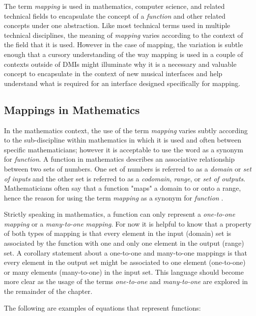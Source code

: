 The term \emph{mapping} is used in mathematics, computer science, and related technical fields to encapsulate the concept of a \emph{function} and other related concepts under one abstraction. Like most technical terms used in multiple technical disciplines, the meaning of \emph{mapping} varies according to the context of the field that it is used. However in the case of mapping, the variation is subtle enough that a cursory understanding of the way mapping is used in a couple of contexts outside of DMIs might illuminate why it is a necessary and valuable concept to encapsulate in the context of new musical interfaces and help understand what is required for an interface designed specifically for mapping.

\subsection{Mappings in Mathematics}
\label{sec:Mappings in Mathematics}

In the mathematics context, the use of the term \emph{mapping} varies subtly according to the sub-discipline within mathematics in which it is used and often between specific mathematicians; however it is acceptable to use the word as a synonym for \emph{function}. A function in mathematics describes an associative relationship between two sets of numbers. One set of numbers is referred to as a \emph{domain} or \emph{set of inputs} and the other set is referred to as a \emph{codomain}, \emph{range}, or \emph{set of outputs}. Mathematicians often say that a function "maps" a domain to or onto a range, hence the reason for using the term \emph{mapping} as a synonym for \emph{function} \cite{functionMapping}.

Strictly speaking in mathematics, a function can only represent a \emph{one-to-one mapping} or a \emph{many-to-one mapping}. For now it is helpful to know that a property of both types of mapping is that every element in the input (domain) set is associated by the function with one and only one element in the output (range) set. A corollary statement about a one-to-one and many-to-one mappings is that every element in the output set might be associated to one element (one-to-one) or many elements (many-to-one) in the input set. This language should become more clear as the usage of the terms \emph{one-to-one} and \emph{many-to-one} are explored in the remainder of the chapter.

The following are examples of equations that represent functions:

